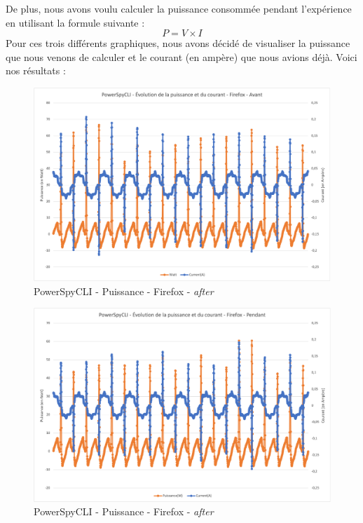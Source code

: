 \documentclass[12pt, a4paper]{report}
\begin{document}
De plus, nous avons voulu calculer la puissance consommée pendant l'expérience en utilisant la formule suivante :
\begin{equation}
    P=V\times I
    \label{eq:puissance}
\end{equation}
Pour ces trois différents graphiques, nous avons décidé de visualiser la puissance que nous venons de calculer et le courant (en ampère) que nous avions déjà. Voici nos résultats :
\begin{figure}[H]
    \includegraphics[width=1\linewidth]{res//graph/PowerSpyCLI/Puissance_ff_avant.png}
    \caption{PowerSpyCLI - Puissance - Firefox - \textit{after}}
    \label{fig:pscli_power_ff_after}
\end{figure}
\begin{figure}[H]
    \includegraphics[width=1\linewidth]{res//graph/PowerSpyCLI/Puissance_ff_pendant.png}
    \caption{PowerSpyCLI - Puissance - Firefox - \textit{after}}
    \label{fig:pscli_power_ff_after}
\end{figure}
\end{document}
